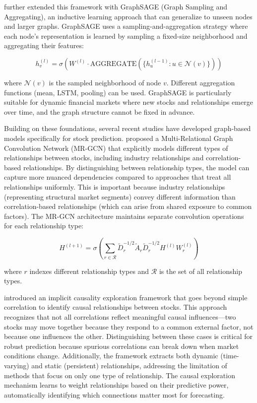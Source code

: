 \cite{hamilton2018inductiverepresentationlearninglarge} further extended this framework with GraphSAGE (Graph Sampling and Aggregating), an inductive learning approach that can generalize to unseen nodes and larger graphs. GraphSAGE uses a sampling-and-aggregation strategy where each node's representation is learned by sampling a fixed-size neighborhood and aggregating their features:

$$h_v^{(l)} = \sigma(W^{(l)} \cdot \text{AGGREGATE}(\{h_u^{(l-1)} : u \in \mathcal{N}(v)\}))$$

where $\mathcal{N}(v)$ is the sampled neighborhood of node $v$. Different aggregation functions (mean, LSTM, pooling) can be used. GraphSAGE is particularly suitable for dynamic financial markets where new stocks and relationships emerge over time, and the graph structure cannot be fixed in advance.

Building on these foundations, several recent studies have developed graph-based models specifically for stock prediction. \cite{9892482} proposed a Multi-Relational Graph Convolution Network (MR-GCN) that explicitly models different types of relationships between stocks, including industry relationships and correlation-based relationships. By distinguishing between relationship types, the model can capture more nuanced dependencies compared to approaches that treat all relationships uniformly. This is important because industry relationships (representing structural market segments) convey different information than correlation-based relationships (which can arise from shared exposure to common factors). The MR-GCN architecture maintains separate convolution operations for each relationship type:

$$H^{(l+1)} = \sigma\left(\sum_{r \in \mathcal{R}} \tilde{D}_r^{-1/2}\tilde{A}_r\tilde{D}_r^{-1/2}H^{(l)}W_r^{(l)}\right)$$

where $r$ indexes different relationship types and $\mathcal{R}$ is the set of all relationship types.

\cite{info15120743} introduced an implicit causality exploration framework that goes beyond simple correlation to identify causal relationships between stocks. This approach recognizes that not all correlations reflect meaningful causal influences—two stocks may move together because they respond to a common external factor, not because one influences the other. Distinguishing between these cases is critical for robust prediction because spurious correlations can break down when market conditions change. Additionally, the framework extracts both dynamic (time-varying) and static (persistent) relationships, addressing the limitation of methods that focus on only one type of relationship. The causal exploration mechanism learns to weight relationships based on their predictive power, automatically identifying which connections matter most for forecasting.

